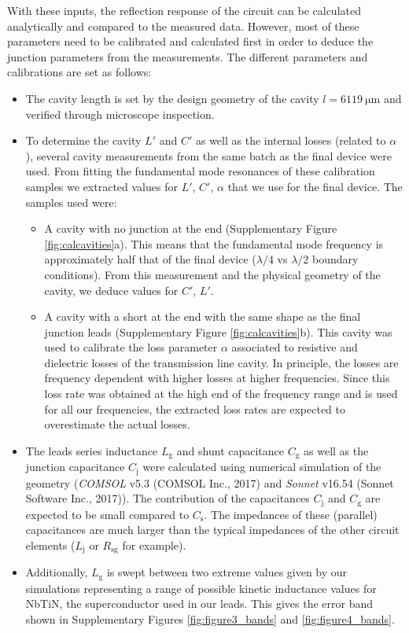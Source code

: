 With these inputs, the reflection response of the circuit can be calculated analytically and compared to the measured data.
However, most of these parameters need to be calibrated and calculated first in order to deduce the junction parameters from the measurements.
The different parameters and calibrations are set as follows:
\begin{itemize}
	\item The cavity length is set by the design geometry of the cavity $l=\SI{6119}{\micro\meter}$ and verified through microscope inspection.
	\item To determine the cavity $L'$ and $C'$ as well as the internal losses (related to $\alpha$), several cavity measurements from the same batch as the final device were used.
	From fitting the fundamental mode resonances of these calibration samples we extracted values for $L'$, $C'$, $\alpha$ that we use for the final device.
	The samples used were:
	\begin{itemize}
		\item A cavity with no junction at the end (Supplementary Figure \ref{fig:calcavities}a).
		This means that the fundamental mode frequency is approximately half that of the final device ($\lambda/4$ vs $\lambda/2$ boundary conditions).
		From this measurement and the physical geometry of the cavity, we deduce values for $C'$, $L'$.
		\item A cavity with a short at the end with the same shape as the final junction leads (Supplementary Figure \ref{fig:calcavities}b).
		This cavity was used to calibrate the loss parameter $\alpha$ associated to resistive and dielectric losses of the transmission line cavity.
		In principle, the losses are frequency dependent with higher losses at higher frequencies.
		Since this loss rate was obtained at the high end of the frequency range and is used for all our frequencies, the extracted loss rates are expected to overestimate the actual losses.
	\end{itemize}
	\item The leads series inductance $L_\text{g}$ and shunt capacitance $C_\text{g}$ as well as the junction capacitance $C_\text{j}$ were calculated using numerical simulation of the geometry (\textit{COMSOL} v5.3 (COMSOL Inc., 2017) and \textit{Sonnet} v16.54 (Sonnet Software Inc., 2017)).
	The contribution of the capacitances $C_\text{j}$ and $C_\text{g}$ are expected to be small compared to $C_\text{s}$.
	The impedances of these (parallel) capacitances are much larger than the typical impedances of the other circuit elements ($L_\text{j}$ or $R_\text{sg}$ for example).
	\item Additionally, $L_\text{g}$ is swept between two extreme values given by our simulations representing a range of possible kinetic inductance values for NbTiN, the superconductor used in our leads.
	This gives the error band shown in Supplementary Figures \ref{fig:figure3_bands} and \ref{fig:figure4_bands}.
\end{itemize}






